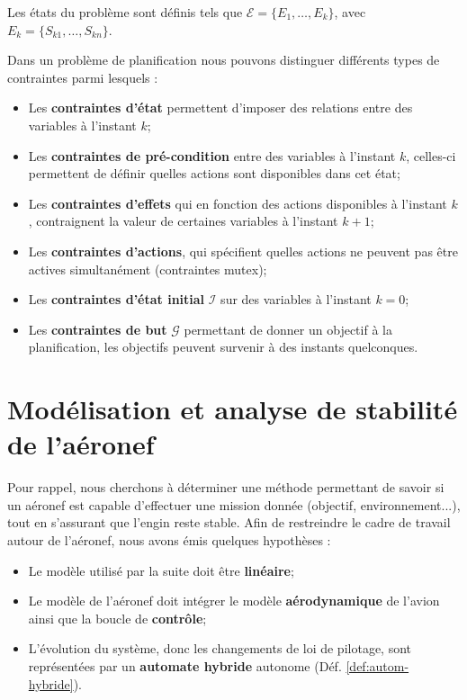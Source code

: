 \begin{definition} Les états du problème sont définis tels que $\mathcal{E} = \{E_1, \dots, E_k\}$, avec $E_k = \{S_{k1}, \dots, S_{kn}\}$. 
	\label{def:etat-csp-planif}
\end{definition}

Dans un problème de planification nous pouvons distinguer différents types de contraintes \cite{artificial_15} parmi lesquels : 
\begin{itemize}
	\item Les \textbf{contraintes d'état} permettent d'imposer des relations entre des variables à l'instant $k$;
	\item Les \textbf{contraintes de pré-condition} entre des variables à l'instant $k$, celles-ci permettent de définir quelles actions sont disponibles dans cet état;
	\item Les \textbf{contraintes d'effets} qui en fonction des actions disponibles à l'instant $k$, contraignent la valeur de certaines variables à l'instant $k+1$;
	\item Les \textbf{contraintes d'actions}, qui spécifient quelles actions ne peuvent pas être actives simultanément (contraintes mutex);
	\item Les \textbf{contraintes d'état initial} $\mathcal{I}$ sur des variables à l'instant $k=0$;
	\item Les \textbf{contraintes de but} $\mathcal{G}$ permettant de donner un objectif à la planification, les objectifs peuvent survenir à des instants quelconques.
\end{itemize}

\section[Modélisation et analyse]{Modélisation et analyse de stabilité de l'aéronef}
Pour rappel, nous cherchons à déterminer une méthode permettant de savoir si un aéronef est capable d'effectuer une mission donnée (objectif, environnement...), tout en s'assurant que l'engin reste stable.
Afin de restreindre le cadre de travail autour de l'aéronef, nous avons émis quelques hypothèses :
\begin{itemize}
\item Le modèle utilisé par la suite doit être \textbf{linéaire};
\item Le modèle de l'aéronef doit intégrer le modèle \textbf{aérodynamique} de l'avion ainsi que la boucle de \textbf{contrôle};
\item L'évolution du système, donc les changements de loi de pilotage, sont représentées par un \textbf{automate hybride} autonome (Déf. \ref*{def:autom-hybride}).
\end{itemize}

